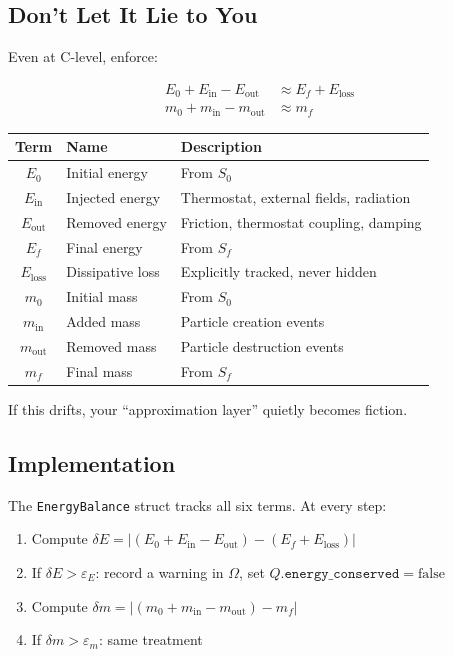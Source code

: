\documentclass[11pt]{article}
\begin{document}
\subsection{Don't Let It Lie to You}

Even at C-level, enforce:

\begin{align}
E_0 + E_\text{in} - E_\text{out} &\approx E_f + E_\text{loss} \\
m_0 + m_\text{in} - m_\text{out} &\approx m_f
\end{align}

\begin{center}
\begin{tabular}{clp{7cm}}
\toprule
\textbf{Term} & \textbf{Name} & \textbf{Description} \\
\midrule
$E_0$ & Initial energy & From $S_0$ \\
$E_\text{in}$ & Injected energy & Thermostat, external fields, radiation \\
$E_\text{out}$ & Removed energy & Friction, thermostat coupling, damping \\
$E_f$ & Final energy & From $S_f$ \\
$E_\text{loss}$ & Dissipative loss & Explicitly tracked, never hidden \\
\midrule
$m_0$ & Initial mass & From $S_0$ \\
$m_\text{in}$ & Added mass & Particle creation events \\
$m_\text{out}$ & Removed mass & Particle destruction events \\
$m_f$ & Final mass & From $S_f$ \\
\bottomrule
\end{tabular}
\end{center}

If this drifts, your ``approximation layer'' quietly becomes fiction.

\subsection{Implementation}

The \texttt{EnergyBalance} struct tracks all six terms. At every step:

\begin{enumerate}
  \item Compute $\delta E = |(E_0 + E_\text{in} - E_\text{out}) - (E_f + E_\text{loss})|$
  \item If $\delta E > \varepsilon_E$: record a warning in $\Omega$, set $Q.\texttt{energy\_conserved} = \text{false}$
  \item Compute $\delta m = |(m_0 + m_\text{in} - m_\text{out}) - m_f|$
  \item If $\delta m > \varepsilon_m$: same treatment
\end{enumerate}
\end{document}
